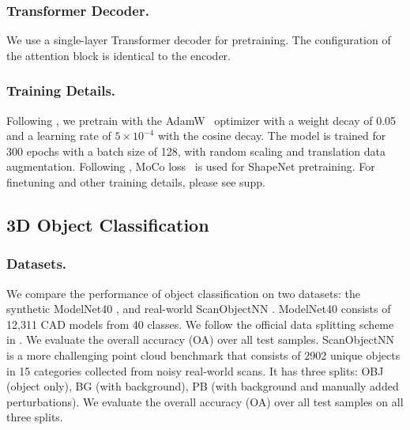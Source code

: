 \documentclass[runningheads]{llncs}
\begin{document}
\vspace{-10pt}
\subsubsection{Transformer Decoder.}  We use a single-layer Transformer decoder for  pretraining.  The configuration of the attention block is identical to the encoder.

\vspace{-10pt}
\subsubsection{Training Details.} Following \cite{yu2021point}, we pretrain with the AdamW~\cite{loshchilov2017decoupled} optimizer with a weight decay of 0.05 and a learning rate of $5\times10^{-4}$ with the cosine decay. The model is trained for 300 epochs with a batch size of 128, with random scaling and translation data augmentation.  Following \cite{yu2021point}, MoCo loss~\cite{he2020momentum} is used for ShapeNet pretraining. For finetuning and other training details, please see supp.

\subsection{3D Object Classification}
\subsubsection{Datasets.}
We compare the performance of object classification on two datasets: the synthetic ModelNet40 \cite{wu20153d}, and real-world ScanObjectNN \cite{uy2019revisiting}.
ModelNet40 \cite{wu20153d} consists of 12,311 CAD models from 40 classes. We follow the official data splitting scheme in \cite{wu20153d}. We evaluate the overall accuracy (OA)  over all test samples.
ScanObjectNN~\cite{uy2019revisiting} is a more challenging point cloud benchmark that consists of 2902 unique objects in 15 categories collected from noisy real-world scans.  It has three splits: OBJ (object only), BG (with background), PB (with background and manually added perturbations). We evaluate the overall accuracy (OA) over all test samples on all three splits.
\end{document}
